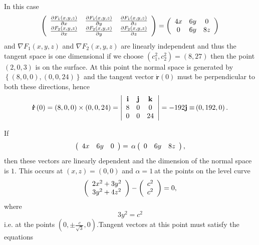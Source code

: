\documentclass[aps,preprint]{revtex4}%
\begin{document}
In this case
\begin{equation}
\left(
\begin{array}
[c]{ccc}%
\frac{\partial F_{1}\left(  x,y,z\right)  }{\partial x} & \frac{\partial
F_{1}\left(  x,y,z\right)  }{\partial y} & \frac{\partial F_{1}\left(
x,y,z\right)  }{\partial z}\\
\frac{\partial F_{2}\left(  x,y,z\right)  }{\partial x} & \frac{\partial
F_{2}\left(  x,y,z\right)  }{\partial y} & \frac{\partial F_{2}\left(
x,y,z\right)  }{\partial z}%
\end{array}
\right)  =\left(
\begin{array}
[c]{ccc}%
4x & 6y & 0\\
0 & 6y & 8z
\end{array}
\right)
\end{equation}
and $\nabla F_{1}\left(  x,y,z\right)  $ and $\nabla F_{2}\left(
x,y,z\right)  $ are linearly independent and thus the tangent space is one
dimensional if we choose $\left(  c_{1}^{2},c_{2}^{2}\right)  =\left(
8,27\right)  $ then the point $\left(  2,0,3\right)  $ is on the surface. At
this point the normal space is generated by $\left\{  \left(  8,0,0\right)
,\left(  0,0,24\right)  \right\}  $ and the tangent vector $\mathbf{\dot{r}%
}\left(  0\right)  $ must be perpendicular to both these directions, hence
\begin{equation}
\mathbf{\dot{r}}\left(  0\right)  =\left(  8,0,0\right)  \times\left(
0,0,24\right)  =\left\vert
\begin{array}
[c]{ccc}%
\mathbf{i} & \mathbf{j} & \mathbf{k}\\
8 & 0 & 0\\
0 & 0 & 24
\end{array}
\right\vert =-192\mathbf{j\equiv}\left(  0,192,0\right)  .
\end{equation}


If
\begin{equation}
\left(
\begin{array}
[c]{ccc}%
4x & 6y & 0
\end{array}
\right)  =\,\alpha\left(
\begin{array}
[c]{ccc}%
0 & 6y & 8z
\end{array}
\right)  ,
\end{equation}
then these vectors are linearly dependent and the dimension of the normal
space is $1.$ This occurs at $\left(  x,z\right)  =\left(  0,0\right)  $ and
$\alpha=1\ $at the points on the level curve
\begin{equation}
\left(
\begin{array}
[c]{c}%
2x^{2}+3y^{2}\\
3y^{2}+4z^{2}%
\end{array}
\right)  -\left(
\begin{array}
[c]{c}%
c^{2}\\
c^{2}%
\end{array}
\right)  =0,
\end{equation}
where
\begin{equation}
3y^{2}=c^{2}%
\end{equation}
i.e. at the points $\left(  0,\pm\frac{c}{\sqrt{3}},0\right)  .$Tangent
vectors at this point must satisfy the equations%
\end{document}
